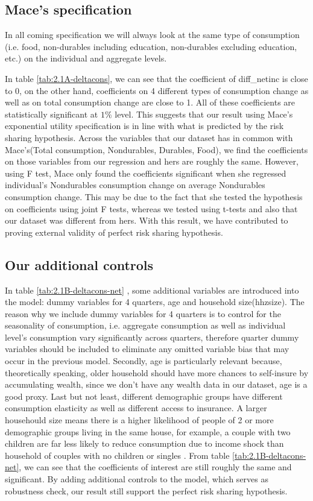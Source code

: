 \documentclass[12pt,a4paper]{article}
\begin{document}
\subsection{Mace's specification}
In all coming specification we will always look at the same type of consumption (i.e. food, non-durables including education, non-durables excluding education, etc.) on the individual and aggregate levels. 




In table \ref{tab:2.1A-deltacons}, we can see that the coefficient of diff\_netinc is close to 0, on the other hand, coefficients on 4 different types of consumption change as well as on total consumption change are close to 1. All of these coefficients are statistically significant at $1\%$ level. This suggests that our result using Mace's exponential utility specification is in line with what is predicted by the risk sharing hypothesis. Across the variables that our dataset has in common with Mace's(Total consumption, Nondurables, Durables, Food), we find the coefficients on those variables from our regression and hers are roughly the same. However, using F test, Mace only found the coefficients significant when she regressed individual's Nondurables consumption change on average Nondurables consumption change. This may be due to the fact that she tested the hypothesis on coefficients using joint F tests, whereas we tested using t-tests and also that our dataset was different from hers. With this result, we have contributed to proving external validity of perfect risk sharing hypothesis.

\subsection{Our additional controls} 

In table \ref{tab:2.1B-deltacons-net} , some additional variables are introduced into the model: dummy variables for 4 quarters, age and household size(hhzsize). The reason why we include dummy variables for 4 quarters is to control for the seasonality of consumption, i.e. aggregate consumption as well as individual level's consumption vary significantly across quarters, therefore quarter dummy variables should be included to eliminate any omitted variable bias that may occur in the previous model. Secondly, age is particularly relevant because, theoretically speaking, older household should have more chances to self-insure by accumulating wealth, since we don't have any wealth data in our dataset, age is a good proxy. Last but not least, different demographic groups have different consumption elasticity as well as different access to insurance. A larger househould size means there is a higher likelihood of people of 2 or more demographic groups living in the same house, for example, a couple with two children are far less likely to reduce consumption due to income shock than household of couples with no children or singles  
. From table \ref{tab:2.1B-deltacons-net}, we can see that the coefficients of interest are still roughly the same and significant. By adding additional controls to the model, which serves as robustness check, our result still support the perfect risk sharing hypothesis.  
\end{document}
